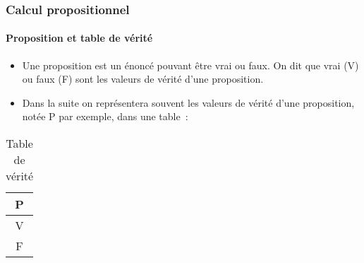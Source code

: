\documentclass[10pt,notheorems]{beamer}
\theoremstyle{plain}
\theoremstyle{definition} %
\begin{document}

\begin{frame}
  \frametitle{Calcul propositionnel}
  \framesubtitle{Proposition et table de vérité}
  \hypertarget{slide_proposition_et_table_de_verite}{}

  \begin{itemize}

  \item Une proposition est un énoncé pouvant être vrai ou faux. On
    dit que vrai (V) ou faux (F) sont les valeurs de vérité d'une
    proposition.\newline

  \item Dans la suite on représentera souvent les valeurs de vérité
    d'une proposition, notée P par exemple, dans une table~:

  \end{itemize}

  \begin{table}[H]

    \centering
    \begin{tabular}[H]{|c|}
      \hline
      P \\ \hline
      V \\
      F \\
      \hline\hline
    \end{tabular}
    \caption{Table de vérité}
    \label{tab:verite}
  \end{table}

\end{frame}

\end{document}
